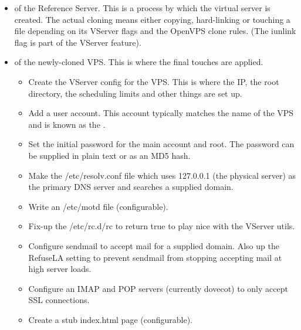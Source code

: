 \begin{itemize}
\begin{itemize}
    \end{itemize}

  \item
     of the Reference Server. This is a process by which
    the virtual server is created. The actual cloning means either
    copying, hard-linking or touching a file depending on its VServer
    flags and the OpenVPS clone rules. (The iunlink flag is part of
    the VServer  feature).

  \item
     of the newly-cloned VPS. This is where the
    final touches are applied.

    \begin{itemize}
      
    \item
      Create the VServer config for the VPS. This is where the IP,
      the root directory, the scheduling limits and other things
      are set up.
      
    \item
	Add a user account. This account typically matches the name of
	the VPS and is known as the . 

    \item
      Set the initial password for the main account and root. The
      password can be supplied in plain text or as an MD5 hash.

    \item
      Make the /etc/resolv.conf file which uses 127.0.0.1 (the
      physical server) as the primary DNS server and searches a
      supplied domain.

    \item
      Write an /etc/motd file (configurable).

    \item
      Fix-up the /etc/rc.d/rc to return true to play nice with the
      VServer utils.

    \item
      Configure sendmail to accept mail for a supplied domain. Also
      up the RefuseLA setting to prevent sendmail from stopping
      accepting mail at high server loads.

    \item
      Configure an IMAP and POP servers (currently dovecot) to only
      accept SSL connections.

    \item
      Create a stub index.html page (configurable).


\end{itemize}
\end{itemize}
